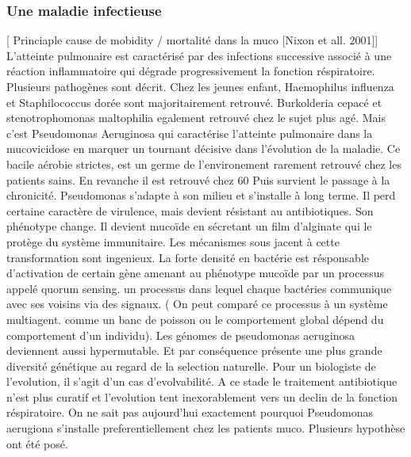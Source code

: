 \documentclass[12pt,a4paper]{article}
\begin{document}
\subsubsection{Une maladie infectieuse}


[ Princiaple cause de mobidity / mortalité dans la muco [Nixon et all. 2001]]
L’atteinte pulmonaire est caractérisé par des infections successive associé à une réaction inflammatoire qui dégrade progressivement la fonction réspiratoire.
Plusieurs pathogènes sont décrit. Chez les jeunes enfant, Haemophilus influenza et Staphilococcus dorée sont majoritairement retrouvé. Burkolderia cepacé et stenotrophomonas maltophilia egalement retrouvé chez le sujet plus agé.
Mais c’est Pseudomonas Aeruginosa qui caractérise l’atteinte pulmonaire dans la mucovicidose en marquer un tournant décisive dans l’évolution de la maladie. Ce bacile aérobie strictes, est un germe de l’environement rarement retrouvé chez les patients sains. En revanche il est retrouvé chez 60%
Puis survient le passage à la chronicité. Pseudomonas s’adapte à son milieu et s’installe à long terme. Il perd certaine caractère de virulence, mais devient résistant au antibiotiques. Son phénotype change. Il devient mucoïde en sécretant un film d’alginate qui le protège du système immunitaire. Les mécanismes sous jacent à cette transformation sont ingenieux. La forte densité en bactérie est résponsable d’activation de certain gène amenant au phénotype mucoïde par un processus appelé quorum sensing. un processus dans lequel chaque bactéries communique avec ses voisins via des signaux. ( On peut comparé ce processus à un système multiagent. comme un banc de poisson ou le comportement global dépend du comportement d’un individu).
Les génomes de pseudomonas aeruginosa deviennent aussi hypermutable. Et par conséquence présente une plus grande diversité génétique au regard de la selection naturelle. Pour un biologiste de l’evolution, il s’agit d’un cas d’evolvabilité.
A ce stade le traitement antibiotique n’est plus curatif et l’evolution tent inexorablement vers un declin de la fonction réspiratoire.
On ne sait pas aujourd’hui exactement pourquoi Pseudomonas aerugiona s’installe preferentiellement chez les patients muco. Plusieurs hypothèse ont été posé.
\end{document}
